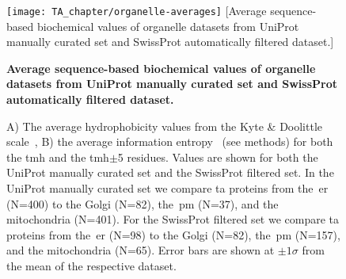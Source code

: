 \begin{figure}
\centering
\texttt{[image: TA\_chapter/organelle-averages]}
[Average sequence\--based biochemical values of organelle datasets from UniProt manually curated set and SwissProt automatically filtered dataset.]
{\textbf{Average sequence\--based biochemical values of organelle datasets from UniProt manually curated set and SwissProt automatically filtered dataset.}

A) The average hydrophobicity values from the Kyte \& Doolittle scale~\cite{Kyte1982}, B) the average information entropy~\cite{Shannon1948} (see methods) for both the \gls{tmh} and the \gls{tmh}$\pm$5 residues.
Values are shown for both the UniProt manually curated set and the SwissProt filtered set.
In the UniProt manually curated set we compare \gls{ta} proteins from the~\gls{er} (N=400) to the Golgi (N=82), the~\gls{pm} (N=37), and the mitochondria (N=401).
For the SwissProt filtered set we compare \gls{ta} proteins from the~\gls{er} (N=98) to the Golgi (N=82), the~\gls{pm} (N=157), and the mitochondria (N=65).
Error bars are shown at $\pm 1 \sigma$ from the mean of the respective dataset.
}

\label{fig:average_organelle_factors_ta}
\end{figure}







